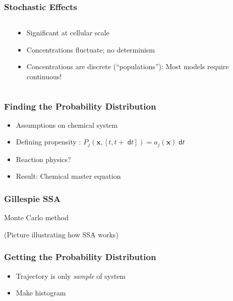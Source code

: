 \documentclass[xcolor={usenames,dvipsnames,svgnames}]{beamer}
\newcommand{\dee}{\;\mathsf{d}}
\renewcommand{\vec}[1]{\ensuremath{\mathbf{#1}}}
\begin{document}
\begin{frame}
    \frametitle{Stochastic Effects}
    \begin{columns}[c]
        \begin{column}{0.5\textwidth}
            \begin{center}
                \resizebox{\textwidth}{!}{
                    
                }
            \end{center}
        \end{column}
        \begin{column}{0.5\textwidth}
            \begin{itemize}
                \item Significant at cellular scale
                \item Concentrations fluctuate; no determinism
                \item Concentrations are discrete (``populations''): Most models require continuous!
            \end{itemize}
        \end{column}
    \end{columns}
\end{frame}

\begin{frame}
    \frametitle{Finding the Probability Distribution}

    \begin{itemize}
        \item Assumptions on chemical system
        \item Defining propensity \cite{gillespie-07}: $ P_j(\vec{x}, [t, t+\dee t]) = a_j(\vec{x})\dee t $
        \item Reaction physics?
        \item Result: Chemical master equation
    \end{itemize}
\end{frame}

\begin{frame}
    \frametitle{Gillespie SSA}
    Monte Carlo method

    (Picture illustrating how SSA works)
\end{frame}

\begin{frame}
    \frametitle{Getting the Probability Distribution}
    \begin{itemize}
        \item Trajectory is only \emph{sample} of system
        \item Make histogram
    \end{itemize}
\end{frame}
\end{document}
